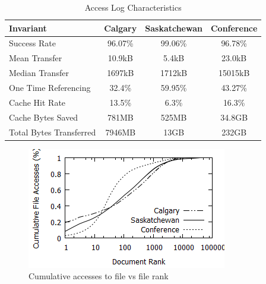 \documentclass[10pt,conference]{IEEEtran}
\begin{document}
\begin{table}
    \caption{Access Log Characteristics}\label{tab:characteristics}
    \begin{tabular}[ht!]{ | l || c | c | c | }
        \hline
        Invariant & Calgary & Saskatchewan & Conference \\
        \hline
        Success Rate & 96.07\% & 99.06\% & 96.78\% \\
        Mean Transfer & 10.9kB & 5.4kB & 23.0kB \\
        Median Transfer & 1697kB & 1712kB & 15015kB \\
        One Time Referencing & 32.4\% & 59.95\% & 43.27\% \\
        Cache Hit Rate & 13.5\% & 6.3\% & 16.3\% \\
        Cache Bytes Saved & 781MB & 525MB & 34.8GB \\
        Total Bytes Transferred & 7946MB & 13GB & 232GB \\
        \hline
    \end{tabular}
\end{table}

\begin{figure}[t]
    \includegraphics{images/concentration}
    \caption{Cumulative accesses to file vs file rank}\label{fig:file_accesses}
\end{figure}
\end{document}
